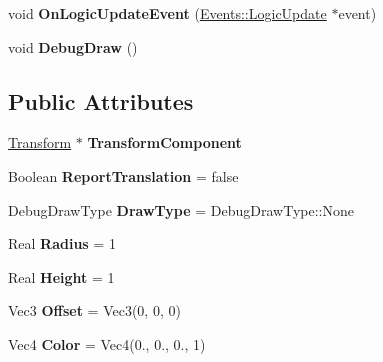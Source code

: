 \begin{DoxyCompactItemize}
\item 
\hypertarget{classDCEngine_1_1Components_1_1DebugReport_a58d365ffcb2638c66cb8f4f799f9ae04}{void {\bfseries On\-Logic\-Update\-Event} (\hyperlink{classDCEngine_1_1Events_1_1LogicUpdate}{Events\-::\-Logic\-Update} $\ast$event)}\label{classDCEngine_1_1Components_1_1DebugReport_a58d365ffcb2638c66cb8f4f799f9ae04}

\item 
\hypertarget{classDCEngine_1_1Components_1_1DebugReport_a923f6c23226ae5823ac6aa650216ff32}{void {\bfseries Debug\-Draw} ()}\label{classDCEngine_1_1Components_1_1DebugReport_a923f6c23226ae5823ac6aa650216ff32}

\end{DoxyCompactItemize}
\subsection*{Public Attributes}
\begin{DoxyCompactItemize}
\item 
\hypertarget{classDCEngine_1_1Components_1_1DebugReport_a0e9fa451136daad9f54c86ab1670233d}{\hyperlink{classDCEngine_1_1Components_1_1Transform}{Transform} $\ast$ {\bfseries Transform\-Component}}\label{classDCEngine_1_1Components_1_1DebugReport_a0e9fa451136daad9f54c86ab1670233d}

\item 
\hypertarget{classDCEngine_1_1Components_1_1DebugReport_a7127dc66cb1ecb1b11e0c73823208739}{Boolean {\bfseries Report\-Translation} = false}\label{classDCEngine_1_1Components_1_1DebugReport_a7127dc66cb1ecb1b11e0c73823208739}

\item 
\hypertarget{classDCEngine_1_1Components_1_1DebugReport_a85849fcbc6567d5a59340bc72279da84}{Debug\-Draw\-Type {\bfseries Draw\-Type} = Debug\-Draw\-Type\-::\-None}\label{classDCEngine_1_1Components_1_1DebugReport_a85849fcbc6567d5a59340bc72279da84}

\item 
\hypertarget{classDCEngine_1_1Components_1_1DebugReport_aea9097f805de22e8f5f26d613ffd3899}{Real {\bfseries Radius} = 1}\label{classDCEngine_1_1Components_1_1DebugReport_aea9097f805de22e8f5f26d613ffd3899}

\item 
\hypertarget{classDCEngine_1_1Components_1_1DebugReport_ae85740dd70834f81c7f3089abb235abc}{Real {\bfseries Height} = 1}\label{classDCEngine_1_1Components_1_1DebugReport_ae85740dd70834f81c7f3089abb235abc}

\item 
\hypertarget{classDCEngine_1_1Components_1_1DebugReport_ac5871b2615855c2279d761b47bac35da}{Vec3 {\bfseries Offset} = Vec3(0, 0, 0)}\label{classDCEngine_1_1Components_1_1DebugReport_ac5871b2615855c2279d761b47bac35da}

\item 
\hypertarget{classDCEngine_1_1Components_1_1DebugReport_af943c965fbf5f529a82623ecd962904a}{Vec4 {\bfseries Color} = Vec4(0., 0., 0., 1)}\label{classDCEngine_1_1Components_1_1DebugReport_af943c965fbf5f529a82623ecd962904a}

\end{DoxyCompactItemize}
